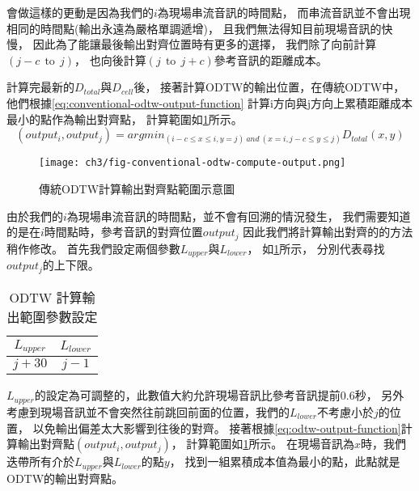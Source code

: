 \documentclass[class=NCU_thesis, crop=false]{standalone}
\begin{document}
會做這樣的更動是因為我們的$i$為現場串流音訊的時間點，
而串流音訊並不會出現相同的時間點(輸出永遠為嚴格單調遞增)，
且我們無法得知目前現場音訊的快慢，
因此為了能讓最後輸出對齊位置時有更多的選擇，
我們除了向前計算$(j-c \ \  \text{to} \ \  j)$，
也向後計算$(j \ \  \text{to} \ \  j+c)$參考音訊的距離成本。

計算完最新的$D_{total}$與$D_{cell}$後，
接著計算ODTW的輸出位置，在傳統ODTW中，
他們根據\cref{eq:conventional-odtw-output-function}
計算i方向與j方向上累積距離成本最小的點作為輸出對齊點，
計算範圍如\cref{fig:fig-ch3-conventional-odtw-compute-output}所示。
\begin{equation} 
    \label{eq:conventional-odtw-output-function}
    (output_i, output_j) = argmin_{(i-c \leq x \leq i, y=j)\ and\ (x=i, j-c \leq y \leq j)}D_{total}(x,y)
\end{equation}

\begin{figure}[H]
    \centering
    \texttt{[image: ch3/fig-conventional-odtw-compute-output.png]}
    \caption{傳統ODTW計算輸出對齊點範圍示意圖}
    \label{fig:fig-ch3-conventional-odtw-compute-output}
\end{figure}

由於我們的$i$為現場串流音訊的時間點，並不會有回溯的情況發生，
我們需要知道的是在$i$時間點時，參考音訊的對齊位置$output_j$
因此我們將計算輸出對齊的的方法稍作修改。
首先我們設定兩個參數$L_{upper}$與$L_{lower}$，
如\cref{table:table-odtw-compute-outputj-parameter-setting}所示，
分別代表尋找$output_j$的上下限。
\begin{table}[h]
    \centering
    \caption{ODTW 計算輸出範圍參數設定}
    \label{table:table-odtw-compute-outputj-parameter-setting}
    \begin{tabular}{|c|c|}
        \hline
        \multicolumn{1}{|c|}{$L_{upper}$} & \multicolumn{1}{|c|}{$L_{lower}$}\\
        \hline
        $j+30$ & $j-1$ \\
        \hline
    \end{tabular}
\end{table}
$L_{upper}$的設定為可調整的，此數值大約允許現場音訊比參考音訊提前0.6秒，
另外考慮到現場音訊並不會突然往前跳回前面的位置，我們的$L_{lower}$不考慮小於$j$的位置，
以免輸出偏差太大影響到往後的對齊。
接著根據\cref{eq:odtw-output-function}計算輸出對齊點$(output_i, output_j)$，
計算範圍如\cref{fig:fig-ch3-conventional-odtw-compute-output}所示。
在現場音訊為$x$時，我們迭帶所有介於$L_{upper}$與$L_{lower}$的點$y$，
找到一組累積成本值為最小的點，此點就是ODTW的輸出對齊點。
\end{document}
